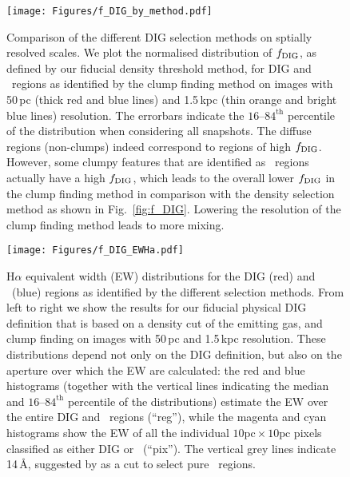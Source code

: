 \documentclass[fleqn,usenatbib]{mnras}
\newcommand\HII{\ion{H}{II}~} %
\begin{document}
\begin{figure}
\texttt{[image: Figures/f\_DIG\_by\_method.pdf]}
\caption{Comparison of the different DIG selection methods on sptially resolved scales. We plot the normalised distribution of $f_{\rm DIG}$, as defined by our fiducial density threshold method, for DIG and \HII regions as identified by the clump finding method on images with 50\,pc (thick red and blue lines) and 1.5\,kpc (thin orange and bright blue lines) resolution. The errorbars indicate the $16$--$84^\text{th}$ percentile of the distribution when considering all snapshots. The diffuse regions (non-clumps) indeed correspond to regions of high $f_{\rm DIG}$. However, some clumpy features that are identified as \HII regions actually have a high $f_{\rm DIG}$, which leads to the overall lower $f_{\rm DIG}$ in the clump finding method in comparison with the density selection method as shown in Fig.~\ref{fig:f_DIG}. Lowering the resolution of the clump finding method leads to more mixing.}
\label{fig:compare_DIG_method}
\end{figure}

\begin{figure*}
\texttt{[image: Figures/f\_DIG\_EWHa.pdf]}
\caption{H$\alpha$ equivalent width (EW) distributions for the DIG (red) and \HII (blue) regions as identified by the different selection methods. From left to right we show the results for our fiducial physical DIG definition that is based on a density cut of the emitting gas, and clump finding on images with 50\,pc and 1.5\,kpc resolution. These distributions depend not only on the DIG definition, but also on the aperture over which the EW are calculated: the red and blue histograms (together with the vertical lines indicating the median and $16$--$84^\text{th}$ percentile of the distributions) estimate the EW over the entire DIG and \HII regions (``reg''), while the magenta and cyan histograms show the EW of all the individual $10\mathrm{pc}\times10\mathrm{pc}$ pixels classified as either DIG or \HII (``pix''). The vertical grey lines indicate 14\,\AA, suggested by \citet{lacerda18} as a cut to select pure \HII regions.}
\label{fig:EW_Halpha}
\end{figure*}
\end{document}
